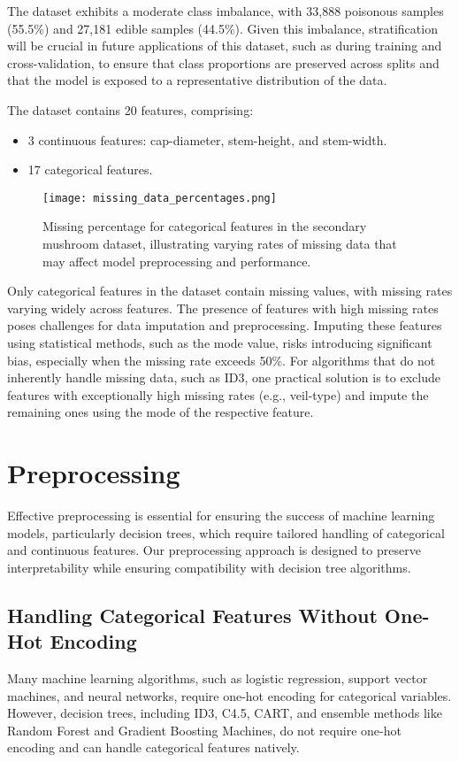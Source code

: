 \documentclass[12pt]{article}
\begin{document}
The dataset exhibits a moderate class imbalance, with 33,888 poisonous samples (55.5\%) and 27,181 edible samples (44.5\%). Given this imbalance, stratification will be crucial in future applications of this dataset, such as during training and cross-validation, to ensure that class proportions are preserved across splits and that the model is exposed to a representative distribution of the data.

The dataset contains 20 features, comprising:
\begin{itemize}
    \item 3 continuous features: cap-diameter, stem-height, and stem-width.
    \item 17 categorical features.
\end{itemize}
\begin{figure}
    \centering
    \texttt{[image: missing\_data\_percentages.png]}
    \caption{Missing percentage for categorical features in the secondary mushroom dataset, illustrating varying rates of missing data that may affect model preprocessing and performance.}
    \label{fig:enter-label}
\end{figure}
Only categorical features in the dataset contain missing values, with missing rates varying widely across features. The presence of features with high missing rates poses challenges for data imputation and preprocessing. Imputing these features using statistical methods, such as the mode value, risks introducing significant bias, especially when the missing rate exceeds 50\%. For algorithms that do not inherently handle missing data, such as ID3, one practical solution is to exclude features with exceptionally high missing rates (e.g., veil-type) and impute the remaining ones using the mode of the respective feature.

\section{Preprocessing}
Effective preprocessing is essential for ensuring the success of machine learning models, particularly decision trees, which require tailored handling of categorical and continuous features. Our preprocessing approach is designed to preserve interpretability while ensuring compatibility with decision tree algorithms.

\subsection{Handling Categorical Features Without One-Hot Encoding}
Many machine learning algorithms, such as logistic regression, support vector machines, and neural networks, require one-hot encoding for categorical variables. However, decision trees, including ID3, C4.5, CART, and ensemble methods like Random Forest and Gradient Boosting Machines, do not require one-hot encoding and can handle categorical features natively.
\end{document}
